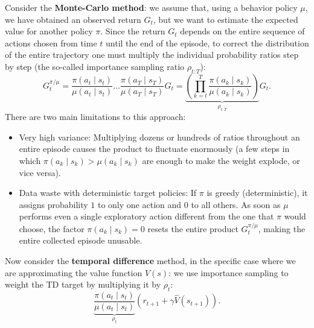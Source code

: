 \documentclass[10pt, a4paper]{report}
\begin{document}
Consider the \textbf{Monte-Carlo method}: we assume that, using a behavior policy $\mu$, we have obtained an observed return $G_t$, but we want to estimate the expected value for another policy $\pi$. Since the return $G_t$ depends on the entire sequence of actions chosen from time $t$ until the end of the episode, to correct the distribution of the entire trajectory one must multiply the individual probability ratios step by step (the so-called importance sampling ratio $\rho_{t:T}$):\begin{equation}
    G_t^{\pi/\mu} =
     \frac{\pi(a_t \mid s_t)}{\mu(a_t \mid s_t)}\dots\frac{\pi(a_T \mid s_T)}{\mu(a_T \mid s_T)}G_t
    =\underbrace{\left( \prod_{k=t}^{T} \frac{\pi(a_k \mid s_k)}{\mu(a_k \mid s_k)} \right)}_{\rho_{t:T}} G_t.
\end{equation}
There are two main limitations to this approach:\begin{itemize}
    \item Very high variance: Multiplying dozens or hundreds of ratios throughout an entire episode causes the product to fluctuate enormously (a few steps in which $\pi(a_k\mid s_k) > \mu(a_k\mid s_k)$ are enough to make the weight explode, or vice versa).
    \item Data waste with deterministic target policies: If $\pi$ is greedy (deterministic), it assigns probability $1$ to only one action and $0$ to all others. As soon as $\mu$ performs even a single exploratory action different from the one that $\pi$ would choose, the factor $\pi(a_k \mid s_k) = 0$ resets the entire product $G_t^{\pi/\mu}$, making the entire collected episode unusable.
\end{itemize}
Now consider the \textbf{temporal difference} method, in the specific case where we are approximating the value function $V(s)$: we use importance sampling to weight the TD target by multiplying it by $\rho_t$:\begin{equation}
    \underbrace{\frac{\pi(a_t \mid s_t)}{\mu(a_t \mid s_t)}}_{\rho_t}\left(r_{t+1}+\gamma\hat V(s_{t+1})\right).
\end{equation}
\end{document}
